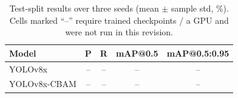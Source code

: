 \begin{table}[!t]
\centering
\caption{Test-split results over three seeds (mean $\pm$ sample std, \%). Cells marked ``--'' require trained checkpoints / a GPU and were not run in this revision.}
\label{tab:seeds}
\setlength{\tabcolsep}{3pt}
\begin{tabular}{lcccc}
\toprule
Model & P & R & mAP@0.5 & mAP@0.5:0.95 \\
\midrule
YOLOv8x & -- & -- & -- & -- \\
YOLOv8x-CBAM & -- & -- & -- & -- \\
\bottomrule
\end{tabular}
\end{table}
